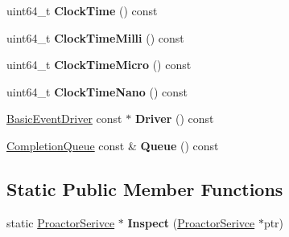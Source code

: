 \begin{DoxyCompactItemize}
\item 
\hypertarget{classlsf_1_1asio_1_1async_1_1ProactorSerivce_a6ec39ecb7fe19d050f4194904b91b862}{
uint64\_\-t {\bfseries ClockTime} () const }
\label{classlsf_1_1asio_1_1async_1_1ProactorSerivce_a6ec39ecb7fe19d050f4194904b91b862}

\item 
\hypertarget{classlsf_1_1asio_1_1async_1_1ProactorSerivce_a028dfeb5686a933132abade33b407d86}{
uint64\_\-t {\bfseries ClockTimeMilli} () const }
\label{classlsf_1_1asio_1_1async_1_1ProactorSerivce_a028dfeb5686a933132abade33b407d86}

\item 
\hypertarget{classlsf_1_1asio_1_1async_1_1ProactorSerivce_a868e08bd60b367c910412b685b83bedb}{
uint64\_\-t {\bfseries ClockTimeMicro} () const }
\label{classlsf_1_1asio_1_1async_1_1ProactorSerivce_a868e08bd60b367c910412b685b83bedb}

\item 
\hypertarget{classlsf_1_1asio_1_1async_1_1ProactorSerivce_a15c5f9bda2cb0ac3494f92cffb509944}{
uint64\_\-t {\bfseries ClockTimeNano} () const }
\label{classlsf_1_1asio_1_1async_1_1ProactorSerivce_a15c5f9bda2cb0ac3494f92cffb509944}

\item 
\hypertarget{classlsf_1_1asio_1_1async_1_1ProactorSerivce_a3dbdbe88a995df89d3829f44abf82e58}{
\hyperlink{classlsf_1_1asio_1_1async_1_1BasicEventDriver}{BasicEventDriver} const $\ast$ {\bfseries Driver} () const }
\label{classlsf_1_1asio_1_1async_1_1ProactorSerivce_a3dbdbe88a995df89d3829f44abf82e58}

\item 
\hypertarget{classlsf_1_1asio_1_1async_1_1ProactorSerivce_a8de473d6fe447231218fdbb92530af72}{
\hyperlink{classlsf_1_1asio_1_1async_1_1CompletionQueue}{CompletionQueue} const \& {\bfseries Queue} () const }
\label{classlsf_1_1asio_1_1async_1_1ProactorSerivce_a8de473d6fe447231218fdbb92530af72}

\end{DoxyCompactItemize}
\subsection*{Static Public Member Functions}
\begin{DoxyCompactItemize}
\item 
\hypertarget{classlsf_1_1asio_1_1async_1_1ProactorSerivce_a4768ab940e5d50a49a29bd709a2acfb3}{
static \hyperlink{classlsf_1_1asio_1_1async_1_1ProactorSerivce}{ProactorSerivce} $\ast$ {\bfseries Inspect} (\hyperlink{classlsf_1_1asio_1_1async_1_1ProactorSerivce}{ProactorSerivce} $\ast$ptr)}
\label{classlsf_1_1asio_1_1async_1_1ProactorSerivce_a4768ab940e5d50a49a29bd709a2acfb3}

\end{DoxyCompactItemize}
